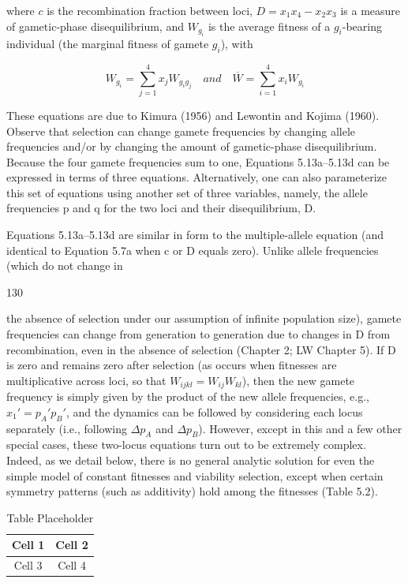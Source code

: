 \documentclass{article}
\begin{document}
where $c$ is the recombination fraction between loci, $D = x_{1}x_{4} - x_{2}x_{3}$ is a measure of gametic-phase disequilibrium, and $W_{g_i}$ is the average fitness of a $g_i$-bearing individual (the marginal fitness of gamete $g_i$), with

\begin{equation}
W_{g_{i}}=\sum_{j=1}^{4}x_{j}W_{g_{i}g_{j}}\quad and\quad\overline{W}=\sum_{i=1}^{4}x_{i}W_{g_{i}}
\tag{5.13e}
\label{eq:5_13e}
\end{equation}

These equations are due to Kimura (1956) and Lewontin and Kojima (1960). Observe that selection can change gamete frequencies by changing allele frequencies and/or by changing the amount of gametic-phase disequilibrium. Because the four gamete frequencies sum to one, Equations 5.13a–5.13d can be expressed in terms of three equations. Alternatively, one can also parameterize this set of equations using another set of three variables, namely, the allele frequencies p and q for the two loci and their disequilibrium, D.

Equations 5.13a–5.13d are similar in form to the multiple-allele equation (and identical to Equation 5.7a when c or D equals zero). Unlike allele frequencies (which do not change in

130

the absence of selection under our assumption of infinite population size), gamete frequencies can change from generation to generation due to changes in D from recombination, even in the absence of selection (Chapter 2; LW Chapter 5). If D is zero and remains zero after selection (as occurs when fitnesses are multiplicative across loci, so that  $ W_{ijkl} = W_{ij} W_{kl} $), then the new gamete frequency is simply given by the product of the new allele frequencies, e.g.,  $ x_1' = p_A' p_B' $, and the dynamics can be followed by considering each locus separately (i.e., following  $ \Delta p_A $ and  $ \Delta p_B $). However, except in this and a few other special cases, these two-locus equations turn out to be extremely complex. Indeed, as we detail below, there is no general analytic solution for even the simple model of constant fitnesses and viability selection, except when certain symmetry patterns (such as additivity) hold among the fitnesses (Table 5.2).

\begin{table}[h]
\centering
\begin{tabular}{|c|c|}
\hline
Cell 1 & Cell 2 \\
\hline
Cell 3 & Cell 4 \\
\hline
\end{tabular}
\caption{Table Placeholder}
\end{table}
\end{document}
